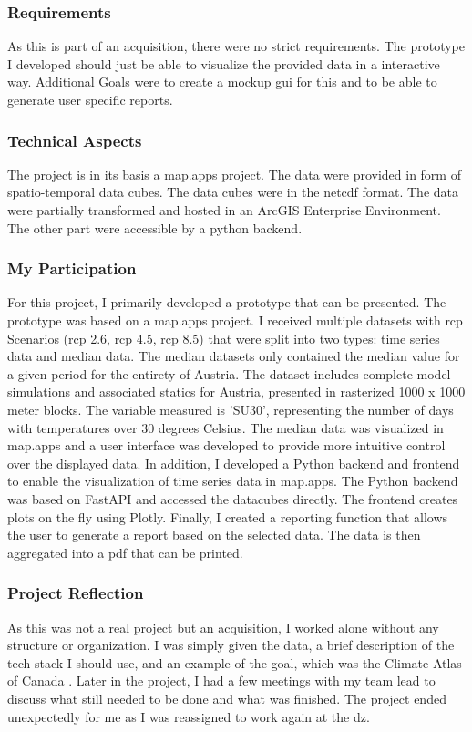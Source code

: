 \documentclass[11pt, titlepage, a4paper]{article}
\begin{document}
\subsubsection{Requirements}
As this is part of an acquisition, there were no strict requirements. The prototype I developed should just be able to visualize the provided data in a interactive way. Additional Goals were to create a mockup \gls{gui} for this and to be able to generate user specific reports.
\subsubsection{Technical Aspects}
The project is in its basis a map.apps project. The data were provided in form of spatio-temporal data cubes. The data cubes were in the \gls{netcdf} format. The data were partially transformed and hosted in an ArcGIS Enterprise Environment. The other part were accessible by a python backend.
\subsubsection{My Participation}
For this project, I primarily developed a prototype that can be presented. The prototype was based on a map.apps project.    I received multiple datasets with \gls{rcp} Scenarios (\gls{rcp} 2.6, \gls{rcp} 4.5, \gls{rcp} 8.5) \cite{intergovernmentalpanelonclimatechangeClimateChange2023} that were split into two types: time series data and median data. The median datasets only contained the median value for a given period for the entirety of Austria. The dataset includes complete model simulations and associated statics for Austria, presented in rasterized 1000 x 1000 meter blocks. The variable measured is 'SU30', representing the number of days with temperatures over 30 degrees Celsius.
The median data was visualized in map.apps and a user interface was developed to provide more intuitive control over the displayed data. In addition, I developed a Python backend and frontend to enable the visualization of time series data in map.apps. The Python backend was based on FastAPI and accessed the datacubes directly. The frontend creates plots on the fly using Plotly. Finally, I created a reporting function that allows the user to generate a report based on the selected data. The data is then aggregated into a \gls{pdf} that can be printed.

\subsubsection{Project Reflection}
As this was not a real project but an acquisition, I worked alone without any structure or organization.  I was simply given the data, a brief description of the tech stack I should use, and an example of the goal, which was the Climate Atlas of Canada \cite{ClimateAtlasCanada}. Later in the project, I had a few meetings with my team lead to discuss what still needed to be done and what was finished. The project ended unexpectedly for me as I was reassigned to work again at the \gls{dz}.
\end{document}
